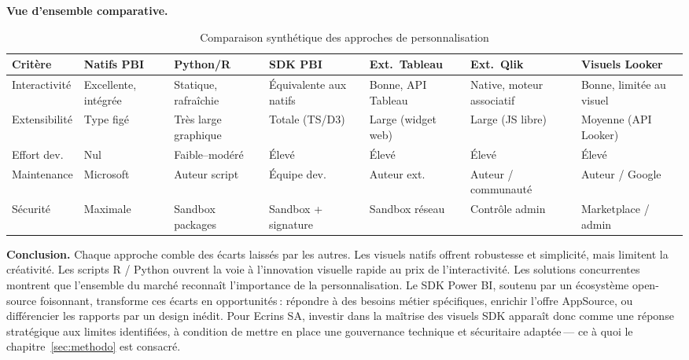 \bigskip
\textbf{Vue d’ensemble comparative.}

\begin{table}[h]
\footnotesize
\centering
\begin{tabularx}{\textwidth}{lXXXXXX}
\toprule
\textbf{Critère} &
\textbf{Natifs PBI} &
\textbf{Python/R} &
\textbf{SDK PBI} &
\textbf{Ext.~Tableau} &
\textbf{Ext.~Qlik} &
\textbf{Visuels Looker} \\
\midrule
Interactivité &
Excellente, intégrée &
Statique, rafraîchie &
Équivalente aux natifs &
Bonne, API Tableau &
Native, moteur associatif &
Bonne, limitée au visuel \\
\addlinespace
Extensibilité &
Type figé &
Très large graphique &
Totale (TS/D3) &
Large (widget web) &
Large (JS libre) &
Moyenne (API Looker) \\
\addlinespace
Effort dev. &
Nul &
Faible–modéré &
Élevé &
Élevé &
Élevé &
Élevé \\
\addlinespace
Maintenance &
Microsoft &
Auteur script &
Équipe dev. &
Auteur ext. &
Auteur / communauté &
Auteur / Google \\
\addlinespace
Sécurité &
Maximale &
Sandbox packages &
Sandbox + signature &
Sandbox réseau &
Contrôle admin &
Marketplace / admin \\
\bottomrule
\end{tabularx}
\caption{Comparaison synthétique des approches de personnalisation}
\label{tab:comparaison-approches}
\end{table}

\medskip
\textbf{Conclusion.}  
Chaque approche comble des écarts laissés par les autres. Les visuels
natifs offrent robustesse et simplicité, mais limitent la créativité. Les
scripts R / Python ouvrent la voie à l’innovation visuelle rapide au prix
de l’interactivité. Les solutions concurrentes montrent que l’ensemble du
marché reconnaît l’importance de la personnalisation. Le SDK Power BI,
soutenu par un écosystème open-source foisonnant, transforme ces écarts en
opportunités : répondre à des besoins métier spécifiques, enrichir
l’offre AppSource, ou différencier les rapports par un design inédit.  
Pour Ecrins SA, investir dans la maîtrise des visuels SDK apparaît donc
comme une réponse stratégique aux limites identifiées, à condition de
mettre en place une gouvernance technique et sécuritaire adaptée — ce à
quoi le chapitre~\ref{sec:methodo} est consacré.
